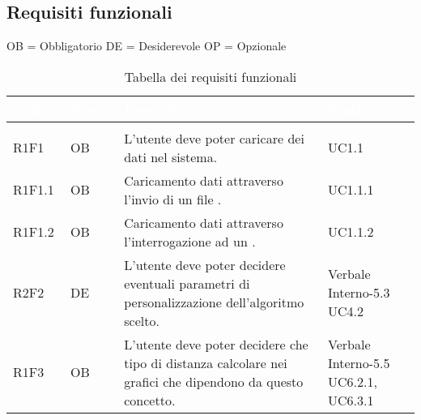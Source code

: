 \subsection{Requisiti funzionali}
OB = Obbligatorio \quad DE = Desiderevole \quad OP = Opzionale
\renewcommand{\arraystretch}{1.5}
{
\setlength\arrayrulewidth{1pt}
\begin{longtable}{C{2cm} | C{1.5cm} | C{9cm} | C{3.3cm}}
		\textcolor{white}{\textbf{Codice}} & 
		\textcolor{white}{\textbf{Classe}} & 
		\textcolor{white}{\textbf{Descrizione}} & 
		\textcolor{white}{\textbf{Fonti}} \\
		\endfirsthead
	    \\
	    \endfoot
	    \caption{Tabella dei requisiti funzionali}
	    \endlastfoot

R1F1 & OB & L'utente deve poter caricare dei dati nel sistema. & UC1.1\\
R1F1.1 & OB & Caricamento dati attraverso l'invio di un file . & UC1.1.1\\
R1F1.2 & OB & Caricamento dati attraverso l'interrogazione ad un . & UC1.1.2\\

R2F2 & DE & L'utente deve poter decidere eventuali parametri di personalizzazione dell'algoritmo scelto. & Verbale Interno-5.3 \newline UC4.2\\

R1F3 & OB & L'utente deve poter decidere che tipo di distanza calcolare nei grafici che dipendono da questo concetto. & Verbale Interno-5.5 \newline UC6.2.1, UC6.3.1\\


\end{longtable}}
